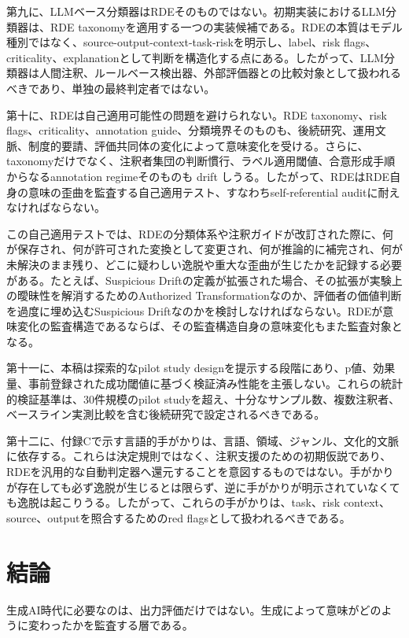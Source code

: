\documentclass[
  a4paper]{ltjsarticle}
\begin{document}
第九に、LLMベース分類器はRDEそのものではない。初期実装におけるLLM分類器は、RDE
taxonomyを適用する一つの実装候補である。RDEの本質はモデル種別ではなく、source-output-context-task-riskを明示し、label、risk
flags、criticality、explanationとして判断を構造化する点にある。したがって、LLM分類器は人間注釈、ルールベース検出器、外部評価器との比較対象として扱われるべきであり、単独の最終判定者ではない。

第十に、RDEは自己適用可能性の問題を避けられない。RDE taxonomy、risk
flags、criticality、annotation
guide、分類境界そのものも、後続研究、運用文脈、制度的要請、評価共同体の変化によって意味変化を受ける。さらに、taxonomyだけでなく、注釈者集団の判断慣行、ラベル適用閾値、合意形成手順からなるannotation regimeそのものも drift しうる。したがって、RDEはRDE自身の意味の歪曲を監査する自己適用テスト、すなわちself-referential
auditに耐えなければならない。

この自己適用テストでは、RDEの分類体系や注釈ガイドが改訂された際に、何が保存され、何が許可された変換として変更され、何が推論的に補完され、何が未解決のまま残り、どこに疑わしい逸脱や重大な歪曲が生じたかを記録する必要がある。たとえば、Suspicious
Driftの定義が拡張された場合、その拡張が実験上の曖昧性を解消するためのAuthorized
Transformationなのか、評価者の価値判断を過度に埋め込むSuspicious
Driftなのかを検討しなければならない。RDEが意味変化の監査構造であるならば、その監査構造自身の意味変化もまた監査対象となる。

第十一に、本稿は探索的なpilot study
designを提示する段階にあり、p値、効果量、事前登録された成功閾値に基づく検証済み性能を主張しない。これらの統計的検証基準は、30件規模のpilot
studyを超え、十分なサンプル数、複数注釈者、ベースライン実測比較を含む後続研究で設定されるべきである。

第十二に、付録Cで示す言語的手がかりは、言語、領域、ジャンル、文化的文脈に依存する。これらは決定規則ではなく、注釈支援のための初期仮説であり、RDEを汎用的な自動判定器へ還元することを意図するものではない。手がかりが存在しても必ず逸脱が生じるとは限らず、逆に手がかりが明示されていなくても逸脱は起こりうる。したがって、これらの手がかりは、task、risk context、source、outputを照合するためのred flagsとして扱われるべきである。

\section{結論}\label{conclusion}

生成AI時代に必要なのは、出力評価だけではない。生成によって意味がどのように変わったかを監査する層である。
\end{document}
